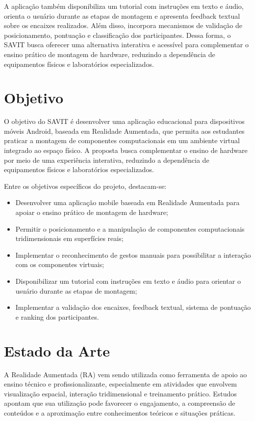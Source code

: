 \documentclass[11pt,a4paper]{article}
\begin{document}
A aplicação também disponibiliza um tutorial com instruções em texto e áudio, orienta o usuário durante as etapas de montagem e apresenta feedback textual sobre os encaixes realizados. Além disso, incorpora mecanismos de validação de posicionamento, pontuação e classificação dos participantes. Dessa forma, o SAVIT busca oferecer uma alternativa interativa e acessível para complementar o ensino prático de montagem de hardware, reduzindo a dependência de equipamentos físicos e laboratórios especializados.


\section{Objetivo}

O objetivo do SAVIT é desenvolver uma aplicação educacional para dispositivos móveis Android, baseada em Realidade Aumentada, que permita aos estudantes praticar a montagem de componentes computacionais em um ambiente virtual integrado ao espaço físico. A proposta busca complementar o ensino de hardware por meio de uma experiência interativa, reduzindo a dependência de equipamentos físicos e laboratórios especializados.

Entre os objetivos específicos do projeto, destacam-se:

\begin{itemize}
    \item Desenvolver uma aplicação mobile baseada em Realidade Aumentada para apoiar o ensino prático de montagem de hardware;
    \item Permitir o posicionamento e a manipulação de componentes computacionais tridimensionais em superfícies reais;
    \item Implementar o reconhecimento de gestos manuais para possibilitar a interação com os componentes virtuais;
    \item Disponibilizar um tutorial com instruções em texto e áudio para orientar o usuário durante as etapas de montagem;
    \item Implementar a validação dos encaixes, feedback textual, sistema de pontuação e ranking dos participantes.
\end{itemize}

\section{Estado da Arte}

A Realidade Aumentada (RA) vem sendo utilizada como ferramenta de apoio ao ensino técnico e profissionalizante, especialmente em atividades que envolvem visualização espacial, interação tridimensional e treinamento prático. Estudos apontam que sua utilização pode favorecer o engajamento, a compreensão de conteúdos e a aproximação entre conhecimentos teóricos e situações práticas.
\end{document}
